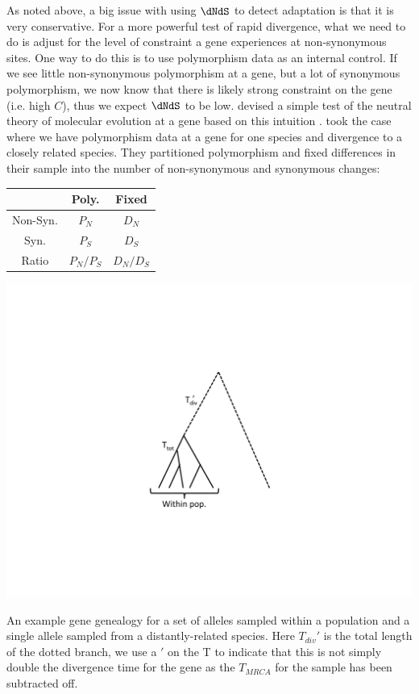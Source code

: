 As noted above, a big issue with using $\dNdS$ to detect adaptation is that it is very conservative. For a more powerful test of rapid divergence, what we need to do is adjust for the level of constraint a gene experiences at non-synonymous sites. One way to do this is to use polymorphism data as an internal control. If we see little non-synonymous polymorphism at a gene, but a  lot of synonymous polymorphism, we now know that there is likely strong constraint on the gene (i.e. high $C$), thus we expect $\dNdS$ to be low. \citet{mcdonald:91} devised a simple test of the neutral theory of molecular evolution at a gene based on this intuition \citep[building on the conceptually similar HKA
test][]{hudson1987test}. \citeauthor{mcdonald:91} took the case where
we have polymorphism data at a gene for one species and divergence to
a closely related species. They  partitioned polymorphism and fixed
differences in their sample into the number of 
non-synonymous and synonymous changes:

\begin{center}
\begin{tabular}{ccc}
 & Poly. & Fixed \\
\hline
Non-Syn. &    $P_N$  &   $D_N$  \\
Syn. &    $P_S$   &     $D_S$   \\
Ratio & $P_N/P_S$ & $D_N/D_S$
\end{tabular}
\end{center}

\begin{marginfigure}
\begin{center}
\includegraphics[width= \textwidth]{figures/Coalescent/MK_tree.pdf}
\end{center}
\caption{An example gene genealogy for a set of alleles sampled within
  a population and a single allele sampled from a distantly-related
  species. Here $T_{div}'$ is the total length of the dotted branch, we use 
  a $'$ on the T to indicate that this is not simply double the divergence
  time for the gene as the $T_{MRCA}$ for the sample has been
  subtracted off.} \label{fig:MK_tree}
\end{marginfigure}


